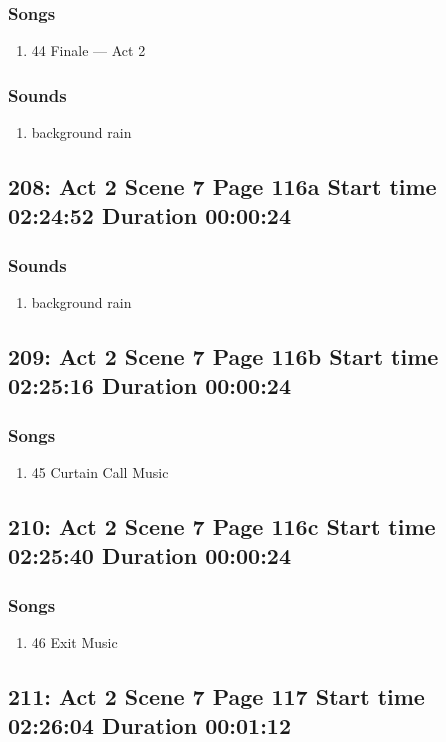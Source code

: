 \subsubsection{Songs}
\begin{enumerate}
\item 44 Finale --- Act 2
\end{enumerate}\subsubsection{Sounds}
\begin{enumerate}
\item background rain
\end{enumerate}
\subsection{208: Act 2 Scene 7 Page 116a Start time 02:24:52 Duration 00:00:24}
\subsubsection{Sounds}
\begin{enumerate}
\item background rain
\end{enumerate}
\subsection{209: Act 2 Scene 7 Page 116b Start time 02:25:16 Duration 00:00:24}
\subsubsection{Songs}
\begin{enumerate}
\item 45 Curtain Call Music
\end{enumerate}
\subsection{210: Act 2 Scene 7 Page 116c Start time 02:25:40 Duration 00:00:24}
\subsubsection{Songs}
\begin{enumerate}
\item 46 Exit Music
\end{enumerate}
\subsection{211: Act 2 Scene 7 Page 117 Start time 02:26:04 Duration 00:01:12}

